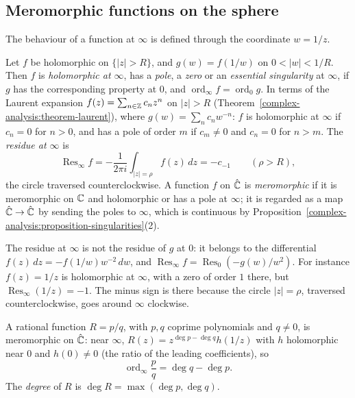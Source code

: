 \subsection{Meromorphic functions on the sphere}\label{complex-analysis:subsection-rational}

The behaviour of a function at $\infty$ is defined through the coordinate $w = 1/z$.

\begin{definition}\label{complex-analysis:definition-infinity}
Let $f$ be holomorphic on $\{|z| > R\}$, and $g(w) = f(1/w)$ on $0 < |w| < 1/R$. Then $f$ is \emph{holomorphic at $\infty$}, has a \emph{pole}, a \emph{zero} or an \emph{essential singularity} at
$\infty$, if $g$ has the corresponding property at $0$, and $\operatorname{ord}_\infty f = \operatorname{ord}_0g$. In terms of the Laurent expansion $f(z) = \sum_{n \in \mathbb{Z}}c_nz^n$ on $|z| > R$
(Theorem~\ref{complex-analysis:theorem-laurent}), where $g(w) = \sum_nc_nw^{-n}$: $f$ is holomorphic at $\infty$ if $c_n = 0$ for $n > 0$, and has a pole of order $m$ if $c_m \neq 0$ and $c_n = 0$ for $n > m$. The
\emph{residue at $\infty$} is
\[
\operatorname{Res}_\infty f = -\frac{1}{2\pi i}\int_{|z| = \rho}f(z)\,dz = -c_{-1} \qquad (\rho > R),
\]
the circle traversed counterclockwise. A function $f$ on $\hat{\mathbb{C}}$ is \emph{meromorphic} if it is meromorphic on $\mathbb{C}$ and holomorphic or has a pole at $\infty$; it is regarded as a map $\hat{\mathbb{C}} \to \hat{\mathbb{C}}$ by sending
the poles to $\infty$, which is continuous by Proposition~\ref{complex-analysis:proposition-singularities}(2).
\end{definition}

The residue at $\infty$ is not the residue of $g$ at $0$: it belongs to the differential $f(z)\,dz = -f(1/w)w^{-2}\,dw$, and $\operatorname{Res}_\infty f = \operatorname{Res}_0(-g(w)/w^2)$. For instance $f(z) = 1/z$ is
holomorphic at $\infty$, with a zero of order $1$ there, but $\operatorname{Res}_\infty(1/z) = -1$. The minus sign is there because the circle $|z| = \rho$, traversed counterclockwise, goes around $\infty$ clockwise.

A rational function $R = p/q$, with $p, q$ coprime polynomials and $q \neq 0$, is meromorphic on $\hat{\mathbb{C}}$: near $\infty$, $R(z) = z^{\deg p - \deg q}h(1/z)$ with $h$ holomorphic near $0$ and $h(0) \neq 0$ (the ratio
of the leading coefficients), so
\begin{equation}\label{complex-analysis:equation-order-infinity}
\operatorname{ord}_\infty\frac pq = \deg q - \deg p.
\end{equation}
The \emph{degree} of $R$ is $\deg R = \max(\deg p, \deg q)$.

